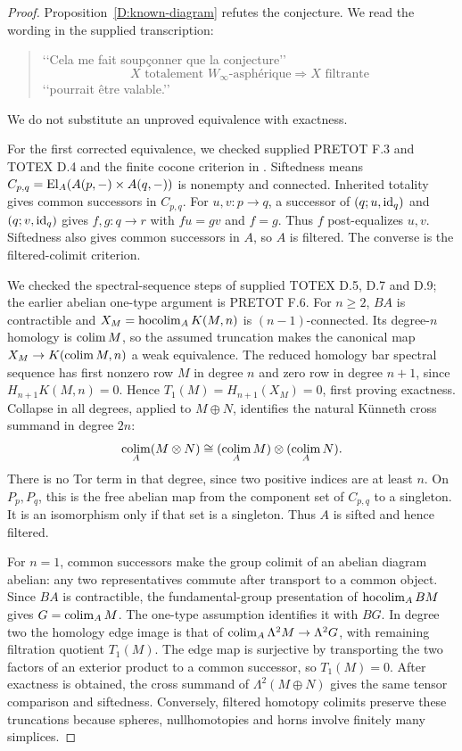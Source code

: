 \begin{proof}
Proposition~\ref{D:known-diagram} refutes the conjecture. We read
the wording in the supplied transcription:
\begin{quote}
\lq\lq Cela me fait soup\c{c}onner que la conjecture\rq\rq
\[
 X\text{ totalement }W_\infty\text{-asph\'erique}
 \Longrightarrow X\text{ filtrante}
\]
\lq\lq pourrait \^etre valable.\rq\rq
\end{quote}
We do not substitute an unproved equivalence with exactness.

For the first corrected equivalence, we checked supplied PRETOT
F.3 and TOTEX D.4 and the finite cocone criterion in
\citet[Sections 15.2(c), 15.9]{GabrielUlmer1971}.
Siftedness means
$C_{p,q}=\operatorname{El}_A(A(p,-)\times A(q,-))$ is nonempty and connected.
Inherited totality gives common successors in $C_{p,q}$.
For $u,v:p\to q$, a successor of
$(q;u,\mathrm{id}_q)$ and $(q;v,\mathrm{id}_q)$ gives $f,g:q\to r$
with $fu=gv$ and $f=g$. Thus $f$ post-equalizes $u,v$.
Siftedness also gives common successors in $A$, so $A$ is
filtered. The converse is the filtered-colimit criterion.

We checked the spectral-sequence steps of supplied TOTEX D.5,
D.7 and D.9; the earlier abelian one-type argument is PRETOT F.6.
For $n\geq2$, $BA$ is contractible and
$X_M=\operatorname*{hocolim}_A K(M,n)$ is $(n-1)$-connected. Its degree-$n$
homology is $\operatorname*{colim} M$, so the assumed truncation makes the
canonical map $X_M\to K(\operatorname*{colim} M,n)$ a weak equivalence.
The reduced homology bar spectral sequence has first nonzero
row $M$ in degree $n$ and zero row in degree $n+1$, since
$H_{n+1}K(M,n)=0$. Hence $T_1(M)=H_{n+1}(X_M)=0$,
first proving exactness. Collapse in all degrees, applied to
$M\oplus N$, identifies the natural K\"unneth cross summand
in degree $2n$:
\[
 \operatorname*{colim}_A(M\otimes N)\cong(\operatorname*{colim}_A M)\otimes(\operatorname*{colim}_A N).
\]
There is no Tor term in that degree, since two positive indices
are at least $n$. On $P_p,P_q$, this is the free abelian map
from the component set of $C_{p,q}$ to a singleton. It is an
isomorphism only if that set is a singleton. Thus $A$ is sifted
and hence filtered.

For $n=1$, common successors make the group colimit of an
abelian diagram abelian: any two representatives commute after
transport to a common object. Since $BA$ is contractible, the
fundamental-group presentation of $\operatorname*{hocolim}_A BM$ gives
$G=\operatorname*{colim}_A M$. The one-type assumption identifies it with
$BG$. In degree two the homology edge image is that of
$\operatorname*{colim}_A\Lambda^2M\to\Lambda^2G$, with remaining filtration
quotient $T_1(M)$. The edge map is surjective by transporting
the two factors of an exterior product to a common successor,
so $T_1(M)=0$. After exactness is obtained, the cross summand
of $\Lambda^2(M\oplus N)$ gives the same tensor comparison
and siftedness. Conversely, filtered homotopy colimits preserve
these truncations because spheres, nullhomotopies and horns
involve finitely many simplices.


\end{proof}
